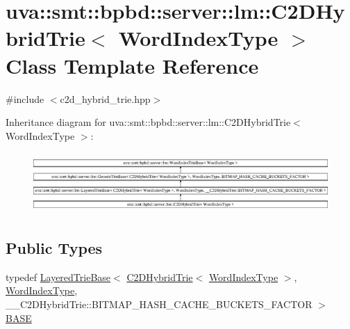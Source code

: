 \hypertarget{classuva_1_1smt_1_1bpbd_1_1server_1_1lm_1_1_c2_d_hybrid_trie}{}\section{uva\+:\+:smt\+:\+:bpbd\+:\+:server\+:\+:lm\+:\+:C2\+D\+Hybrid\+Trie$<$ Word\+Index\+Type $>$ Class Template Reference}
\label{classuva_1_1smt_1_1bpbd_1_1server_1_1lm_1_1_c2_d_hybrid_trie}


{\ttfamily \#include $<$c2d\+\_\+hybrid\+\_\+trie.\+hpp$>$}

Inheritance diagram for uva\+:\+:smt\+:\+:bpbd\+:\+:server\+:\+:lm\+:\+:C2\+D\+Hybrid\+Trie$<$ Word\+Index\+Type $>$\+:\begin{figure}[H]
\begin{center}
\leavevmode
\includegraphics[height=2.345550cm]{classuva_1_1smt_1_1bpbd_1_1server_1_1lm_1_1_c2_d_hybrid_trie}
\end{center}
\end{figure}
\subsection*{Public Types}
\begin{DoxyCompactItemize}
\item 
typedef \hyperlink{classuva_1_1smt_1_1bpbd_1_1server_1_1lm_1_1_layered_trie_base}{Layered\+Trie\+Base}$<$ \hyperlink{classuva_1_1smt_1_1bpbd_1_1server_1_1lm_1_1_c2_d_hybrid_trie}{C2\+D\+Hybrid\+Trie}$<$ \hyperlink{classuva_1_1smt_1_1bpbd_1_1server_1_1lm_1_1_word_index_trie_base_a77ee32bf3a9f8a89558bda4f2031200c}{Word\+Index\+Type} $>$, \hyperlink{classuva_1_1smt_1_1bpbd_1_1server_1_1lm_1_1_word_index_trie_base_a77ee32bf3a9f8a89558bda4f2031200c}{Word\+Index\+Type}, \+\_\+\+\_\+\+C2\+D\+Hybrid\+Trie\+::\+B\+I\+T\+M\+A\+P\+\_\+\+H\+A\+S\+H\+\_\+\+C\+A\+C\+H\+E\+\_\+\+B\+U\+C\+K\+E\+T\+S\+\_\+\+F\+A\+C\+T\+O\+R $>$ \hyperlink{classuva_1_1smt_1_1bpbd_1_1server_1_1lm_1_1_c2_d_hybrid_trie_ab01d9acc9e19bcebd085a9772187807f}{B\+A\+S\+E}
\end{DoxyCompactItemize}
